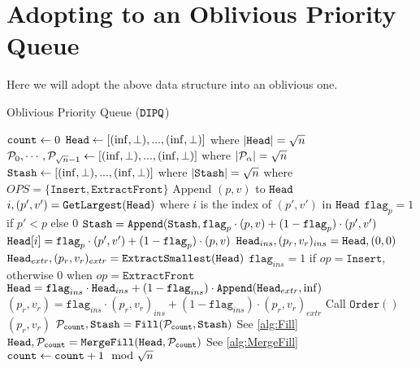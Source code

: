 \section{Adopting to an Oblivious Priority Queue}
Here we will adopt the above data structure into an oblivious one.

\newcommand{\flag}{\texttt{flag}}
\newcommand{\DIPQOperation}{\texttt{Access}}
\newcommand{\experiment}{\textbf{Exp}}
\newcommand{\Append}{\texttt{Append}}
	
\begin{algorithm}
	\caption{Oblivious Priority Queue ($\texttt{DIPQ}$)}
	\label{alg:ObvQueue}
	\begin{algorithmic}[1]
		\Function{$\DIPQInit$}{}
		\State ${\texttt{count}} \gets 0$
		\State $\texttt{Head} \gets [(\inf, \bot), ..., (\inf, \bot)]$ where $|\texttt{Head}| = {\sqrt{n}}$
		\State $\mathcal{P}_0, \cdots, \mathcal{P}_{{\sqrt{n}}-1} \gets [(\inf, \bot), ..., (\inf, \bot)]$ where $|\mathcal{P}_\alpha| = {\sqrt{n}}$
		\State $\texttt{Stash} \gets [(\inf, \bot), ..., (\inf, \bot)]$ where $|\texttt{Stash}| = {\sqrt{n}}$
		\EndFunction
		\Function{$\DIPQOperation$}{$p, v, op \in OPS$} \Comment where $OPS = \{\texttt{Insert}, \texttt{ExtractFront}\}$
			\State Append $(p, v)$ to $\texttt{Head}$
			\State $i, (p', v') = \texttt{GetLargest}(\texttt{Head})$ where $i$ is the index of $(p', v')$ in $\texttt{Head}$
			\State $\flag_{p} = 1$ if $p' < p$ else $0$
			\State $\DIPQstash =  \Append(\DIPQstash, \flag_p \cdot (p, v) + (1 - \flag_p) \cdot (p', v')$
			\State $\DIPQhead[i] = \flag_p \cdot (p', v') + (1 - \flag_p) \cdot (p, v)$
			\State $\texttt{Head}_{ins}, (p_r, v_r)_{ins} =  \texttt{Head}, (0, 0)$
			\State $\texttt{Head}_{extr}, (p_r, v_r)_{extr} =  \texttt{ExtractSmallest}(\texttt{Head})$
			\State $\flag_{ins} = 1$ if $op = \texttt{Insert}$, otherwise $0$ when $op = \texttt{ExtractFront}$
			\State $\DIPQhead = \flag_{ins} \cdot \DIPQhead_{ins} + (1 - \flag_{ins}) \cdot \Append(\DIPQhead_{extr}, \inf)$
			\State $(p_r, v_r) = \flag_{ins} \cdot (p_r, v_r)_{ins} + (1 - \flag_{ins}) \cdot (p_r, v_r)_{extr}$
			\State Call $\texttt{Order}()$ \label{algline:ObvPQOrderOp}
			\State \Return $(p_r, v_r)$
		\EndFunction
		\Function{$\DIPQOrder$}{}
			\State $\mathcal{P}_{{\texttt{count}}}, \texttt{Stash} = \texttt{Fill}(\mathcal{P}_{\texttt{count}}, \texttt{Stash})$ \Comment See \cref{alg:Fill}
			\State $\texttt{Head}, \mathcal{P}_{\texttt{count}} = \texttt{MergeFill}(\texttt{Head}, \mathcal{P}_{\texttt{count}})$ \Comment See \cref{alg:MergeFill}
			\State ${\texttt{count}} \gets {\texttt{count}} + 1 \mod {{\sqrt{n}}}$
		\EndFunction
	\end{algorithmic}
\end{algorithm}



